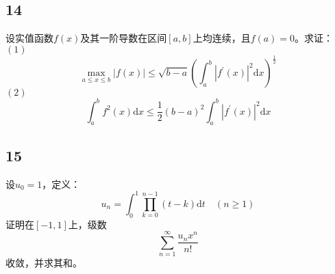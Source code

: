 \documentclass[a4paper,12pt]{article}
\begin{document}
\subsection*{14}\noindent 设实值函数$f\left(x\right)$及其一阶导数在区间$\left[a,b\right]$上均连续，且$f\left(a\right)=0$。求证：\\
\noindent$\left(1\right)$
\begin{equation*}
	\max\limits_{a\leq x\leq b}\left|f\left(x\right)\right|\leq\sqrt{b-a}\left(\int_{a}^{b}\left|f^{\prime}\left(x\right)\right|^2\mathrm{d}x\right)^{\frac{1}{2}}
\end{equation*}
\noindent$\left(2\right)$\begin{equation*}
	\int_{a}^{b}f^{2}\left(x\right)\mathrm{d}x\leq\frac{1}{2}\left(b-a\right)^2\int_{a}^{b}\left|f^{\prime}\left(x\right)\right|^2\mathrm{d}x
\end{equation*}
\subsection*{15}\noindent 设$u_{0}=1$，定义：
\begin{equation*}
	u_{n}=\int_{0}^{1}\prod_{k=0}^{n-1}\left(t-k\right)\mathrm{d}t\quad\left(n\geq 1\right)
\end{equation*}
证明在$\left[-1,1\right]$上，级数
\begin{equation*}
	\sum_{n=1}^{\infty}\frac{u_{n}x^{n}}{n!}
\end{equation*}
收敛，并求其和。
\end{document}
